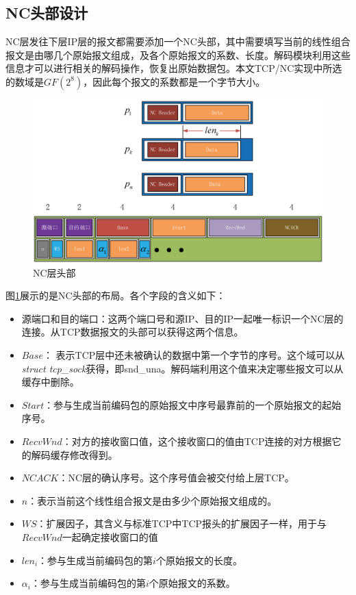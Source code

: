 \subsection{NC头部设计}
NC层发往下层IP层的报文都需要添加一个NC头部，其中需要填写当前的线性组合报文是由哪几个原始报文组成，及各个原始报文的系数、长度。解码模块利用这些信息才可以进行相关的解码操作，恢复出原始数据包。本文TCP/NC实现中所选的数域是$GF\left(2^8\right)$，因此每个报文的系数都是一个字节大小。
\begin{figure}[htbp] 
	\centering
	\includegraphics[width=5in]{figures/codingheader.eps}
	\caption{NC层头部}
	\label{CODINGHEADER_EPS}
\end{figure}
图\ref{CODINGHEADER_EPS}展示的是NC头部的布局。各个字段的含义如下：
\begin{itemize}[leftmargin=.5in]
	\item 源端口和目的端口：这两个端口号和源IP、目的IP一起唯一标识一个NC层的连接。从TCP数据报文的头部可以获得这两个信息。
	\item $Base$： 表示TCP层中还未被确认的数据中第一个字节的序号。这个域可以从\emph{struct tcp\_sock}获得，即snd\_una。解码端利用这个值来决定哪些报文可以从缓存中删除。
	\item $Start$：参与生成当前编码包的原始报文中序号最靠前的一个原始报文的起始序号。
	\item $RecvWnd$：对方的接收窗口值，这个接收窗口的值由TCP连接的对方根据它的解码缓存修改得到。
	\item $NCACK$：NC层的确认序号。这个序号值会被交付给上层TCP。
	\item $n$：表示当前这个线性组合报文是由多少个原始报文组成的。
	\item $WS$：扩展因子，其含义与标准TCP中TCP报头的扩展因子一样，用于与$RecvWnd$一起确定接收窗口的值
	\item $len_{i}$：参与生成当前编码包的第$i$个原始报文的长度。
	\item $\alpha_{i}$：参与生成当前编码包的第$i$个原始报文的系数。
\end{itemize}
